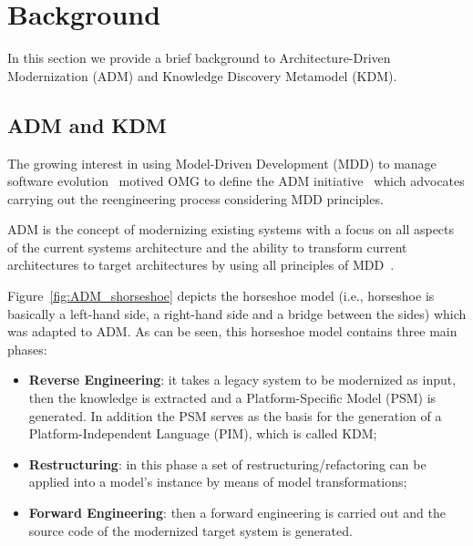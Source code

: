 
\section{Background} %
\label{sec:background}

In this section we provide a brief background to Architecture-Driven Modernization (ADM) and Knowledge Discovery Metamodel (KDM). 


\subsection{ADM and KDM}

The growing interest in using Model-Driven Development (MDD) to manage software evolution~\cite{Heckel2008, Andrade:2005, Reus:2006} 
%
%
motived OMG to define the ADM initiative~\cite{1686216} which advocates carrying out the reengineering process considering MDD principles. 

ADM is the concept of modernizing existing systems with a focus on all aspects of the current systems architecture and the ability to transform current architectures to target architectures by using all principles of MDD~\cite[p.~60]{Ulrich:2010:IST:1841736}. 


Figure~\ref{fig:ADM_shorseshoe} depicts the horseshoe model (i.e., horseshoe is basically a left-hand
side, a right-hand side and a bridge between the sides) which was adapted to ADM. %
As can be seen, this horseshoe model contains three main phases:

\begin{itemize}

\item \textbf{Reverse Engineering}: it takes a legacy system to be modernized as input, then the knowledge is extracted and a Platform-Specific Model (PSM) is generated. In addition the PSM serves as the basis for the generation of a Platform-Independent Language (PIM), which is called KDM;

\item \textbf{Restructuring}: in this phase a set of restructuring/refactoring can be applied into a model's instance by means of model transformations;

\item \textbf{Forward Engineering}: then a forward engineering is carried out and the source code of the modernized target system is generated.

\end{itemize} 

